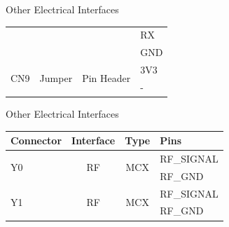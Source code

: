 \begin{frame}{Other Electrical Interfaces}
\begin{table}[!htb]
\begin{tabular}{lccl}
                                 &                       &                            & RX \\
                                 &                       &                            & GND \\
            \midrule
            \multirow{2}{*}{CN9} & \multirow{2}{*}{Jumper} & \multirow{2}{*}{Pin Header} & 3V3 \\
                                 &                         &                      & - \\
            \bottomrule[1.5pt]
        \end{tabular}
    \end{table}

\end{frame}

\begin{frame}{Other Electrical Interfaces}

    \begin{table}[!htb]\tiny
        \centering
        \label{tab:icd}
        \begin{tabular}{lccl}
            \toprule[1.5pt]
            \textbf{Connector} & \textbf{Interface} & \textbf{Type} & \textbf{Pins} \\
            \midrule
            \multirow{2}{*}{Y0} & \multirow{2}{*}{RF} & \multirow{2}{*}{MCX} & RF\_SIGNAL \\
                                &                     &                      & RF\_GND \\
            \midrule
            \multirow{2}{*}{Y1} & \multirow{2}{*}{RF} & \multirow{2}{*}{MCX} & RF\_SIGNAL \\
                                &                     &                      & RF\_GND \\
            \bottomrule[1.5pt]
        \end{tabular}
    \end{table}

\end{frame}

